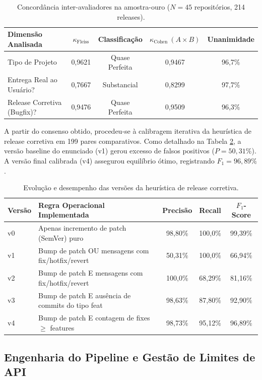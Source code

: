 \documentclass[12pt]{article}
\begin{document}
\begin{table}[htbp]
\centering
\caption{Concordância inter-avaliadores na amostra-ouro ($N = 45$ repositórios, 214 releases).}
\label{tab:fleiss}
\footnotesize
\setlength{\tabcolsep}{4pt}
\begin{tabular}{lcccc}
\toprule
Dimensão Analisada & $\kappa_{\text{Fleiss}}$ & Classificação \cite{landis1977} & $\kappa_{\text{Cohen}}\ (A \times B)$ & Unanimidade \\
\midrule
Tipo de Projeto & 0,9621 & Quase Perfeita & 0,9467 & 96,7\% \\
Entrega Real ao Usuário? & 0,7667 & Substancial & 0,8299 & 97,7\% \\
Release Corretiva (Bugfix)? & 0,9476 & Quase Perfeita & 0,9509 & 96,3\% \\
\bottomrule
\end{tabular}
\end{table}

A partir do consenso obtido, procedeu-se à calibragem iterativa da heurística de release corretiva em 199 pares comparativos. Como detalhado na Tabela \ref{tab:heuristicas}, a versão baseline do enunciado (v1) gerou excesso de falsos positivos ($P = 50{,}31\%$). A versão final calibrada (v4) assegurou equilíbrio ótimo, registrando $F_1 = 96{,}89\%$.

\begin{table}[htbp]
\centering
\caption{Evolução e desempenho das versões da heurística de release corretiva.}
\label{tab:heuristicas}
\footnotesize
\setlength{\tabcolsep}{3pt}
\begin{tabular}{lp{5.8cm}ccc}
\toprule
Versão & Regra Operacional Implementada & Precisão & Recall & $F_1$-Score \\
\midrule
v0 & Apenas incremento de patch (SemVer) puro & 98,80\% & 100,0\% & 99,39\% \\
v1 & Bump de patch OU mensagens com fix/hotfix/revert & 50,31\% & 100,0\% & 66,94\% \\
v2 & Bump de patch E mensagens com fix/hotfix/revert & 100,0\% & 68,29\% & 81,16\% \\
v3 & Bump de patch E ausência de commits do tipo feat & 98,63\% & 87,80\% & 92,90\% \\
v4 & Bump de patch E contagem de fixes $\ge$ features & 98,73\% & 95,12\% & 96,89\% \\
\bottomrule
\end{tabular}
\end{table}

\subsection{Engenharia do Pipeline e Gestão de Limites de API}
\end{document}
